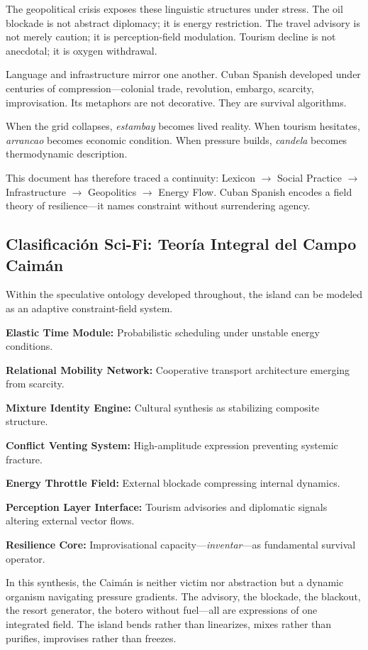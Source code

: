 \documentclass[12pt]{article}
\begin{document}
The geopolitical crisis exposes these linguistic structures under stress. The oil blockade is not abstract diplomacy; it is energy restriction. The travel advisory is not merely caution; it is perception-field modulation. Tourism decline is not anecdotal; it is oxygen withdrawal.

Language and infrastructure mirror one another. Cuban Spanish developed under centuries of compression---colonial trade, revolution, embargo, scarcity, improvisation. Its metaphors are not decorative. They are survival algorithms.

When the grid collapses, \textit{estambay} becomes lived reality. When tourism hesitates, \textit{arrancao} becomes economic condition. When pressure builds, \textit{candela} becomes thermodynamic description.

This document has therefore traced a continuity: Lexicon $\to$ Social Practice $\to$ Infrastructure $\to$ Geopolitics $\to$ Energy Flow. Cuban Spanish encodes a field theory of resilience---it names constraint without surrendering agency.

\subsection*{Clasificación Sci-Fi: Teoría Integral del Campo Caimán}

Within the speculative ontology developed throughout, the island can be modeled as an adaptive constraint-field system.

\textbf{Elastic Time Module:} Probabilistic scheduling under unstable energy conditions.

\textbf{Relational Mobility Network:} Cooperative transport architecture emerging from scarcity.

\textbf{Mixture Identity Engine:} Cultural synthesis as stabilizing composite structure.

\textbf{Conflict Venting System:} High-amplitude expression preventing systemic fracture.

\textbf{Energy Throttle Field:} External blockade compressing internal dynamics.

\textbf{Perception Layer Interface:} Tourism advisories and diplomatic signals altering external vector flows.

\textbf{Resilience Core:} Improvisational capacity---\textit{inventar}---as fundamental survival operator.

In this synthesis, the Caimán is neither victim nor abstraction but a dynamic organism navigating pressure gradients. The advisory, the blockade, the blackout, the resort generator, the botero without fuel---all are expressions of one integrated field. The island bends rather than linearizes, mixes rather than purifies, improvises rather than freezes.
\end{document}
